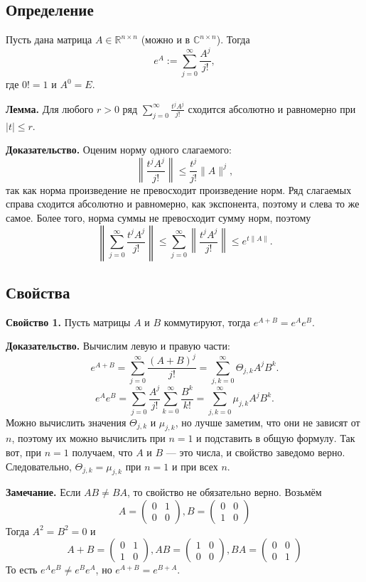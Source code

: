 \subsection{Определение}
Пусть дана матрица $A \in \mathbb R^{n \times n}$ (можно и в $\mathbb C^{n \times n}$).
Тогда
\[
    e^A := \sum_{j=0}^{\infty} \frac{A^j}{j!},
\]
где $0! = 1$ и $A^0 = E$.

\textbf{Лемма.} Для любого $r > 0$ ряд $\sum_{j=0}^{\infty} \frac{t^j A^j}{j!}$ сходится абсолютно и равномерно при $|t| \le r$.

\textbf{Доказательство.} Оценим норму одного слагаемого:
\[
    \left\| \frac{t^j A^j}{j!} \right\| \le \frac{t^j}{j!} \| A \|^j,
\]
так как норма произведение не превосходит произведение норм.
Ряд слагаемых справа сходится абсолютно и равномерно, как экспонента, поэтому и слева то же самое.
Более того, норма суммы не превосходит сумму норм, поэтому
\[
    \left\| \sum_{j=0}^{\infty} \frac{t^j A^j}{j!} \right\| \le 
    \sum_{j=0}^{\infty} \left\| \frac{t^j A^j}{j!} \right\| \le 
    e^{t\|A\|}.
\]

\QED

\subsection{Свойства}
\textbf{Свойство 1.} Пусть матрицы $A$ и $B$ коммутируют, тогда $e^{A + B} = e^A e^B$.

\textbf{Доказательство.}
Вычислим левую и правую части:
\[
    e^{A+B} = \sum_{j=0}^{\infty} \frac{(A+B)^j}{j!} = \sum_{j,k=0}^{\infty} \Theta_{j,k} A^j B^k.
\]
\[
    e^A e^B = \sum_{j=0}^{\infty} \frac{A^j}{j!} \sum_{k=0}^{\infty} \frac{B^k}{k!} = \sum_{j,k=0}^{\infty} \mu_{j,k} A^j B^k.
\]
Можно вычислить значения $\Theta_{j,k}$ и $\mu_{j,k}$, но лучше заметим, что они не зависят от $n$, поэтому их можно вычислить при $n = 1$ и подставить в общую формулу.
Так вот, при $n = 1$ получаем, что $A$ и $B$ --- это числа, и свойство заведомо верно.
Следовательно, $\Theta_{j,k} = \mu_{j,k}$ при $n = 1$ и при всех $n$.

\QED

\textbf{Замечание.} Если $AB \ne BA$, то свойство не обязательно верно.
Возьмём 
\[
    A =
    \begin{pmatrix}
        0 & 1 \\
        0 & 0
    \end{pmatrix}
    ,
    B =
    \begin{pmatrix}
        0 & 0 \\
        1 & 0
    \end{pmatrix}
\]
Тогда $A^2 = B^2 = 0$ и
\[
    A + B =
    \begin{pmatrix}
        0 & 1 \\
        1 & 0
    \end{pmatrix},
    AB =
    \begin{pmatrix}
        1 & 0 \\
        0 & 0
    \end{pmatrix},
    BA =
    \begin{pmatrix}
        0 & 0 \\
        0 & 1
    \end{pmatrix}
\]
То есть $e^A e^B \ne e^B e^A$, но $e^{A + B} = e^{B + A}$.

